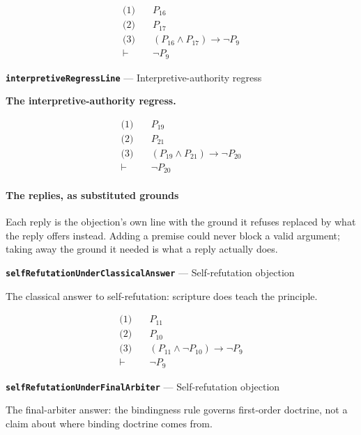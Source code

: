 \documentclass[11pt]{article}
\begin{document}
\begin{align*}
  \text{(1)} \quad & P_{16} \\
  \text{(2)} \quad & P_{17} \\
  \text{(3)} \quad & (P_{16} \land P_{17}) \rightarrow \lnot P_{9} \\
  \vdash \quad & \lnot P_{9}
\end{align*}
\par\medskip\noindent\textbf{\texttt{interpretive\allowbreak{}Regress\allowbreak{}Line}} --- Interpretive-authority regress\par\nobreak\noindent
\textbf{The interpretive-authority regress.}

\begin{align*}
  \text{(1)} \quad & P_{19} \\
  \text{(2)} \quad & P_{21} \\
  \text{(3)} \quad & (P_{19} \land P_{21}) \rightarrow \lnot P_{20} \\
  \vdash \quad & \lnot P_{20}
\end{align*}
\paragraph*{The replies, as substituted grounds}
\leavevmode\par
Each reply is the objection's own line with the ground it refuses replaced by what the reply offers instead. Adding a premise could never block a valid argument; taking away the ground it needed is what a reply actually does.

\par\medskip\noindent\textbf{\texttt{self\allowbreak{}Refutation\allowbreak{}Under\allowbreak{}Classical\allowbreak{}Answer}} --- Self-refutation objection\par\nobreak\noindent
The classical answer to self-refutation: scripture does teach the principle.

\begin{align*}
  \text{(1)} \quad & P_{11} \\
  \text{(2)} \quad & P_{10} \\
  \text{(3)} \quad & (P_{11} \land \lnot P_{10}) \rightarrow \lnot P_{9} \\
  \vdash \quad & \lnot P_{9}
\end{align*}
\par\medskip\noindent\textbf{\texttt{self\allowbreak{}Refutation\allowbreak{}Under\allowbreak{}Final\allowbreak{}Arbiter}} --- Self-refutation objection\par\nobreak\noindent
The final-arbiter answer: the bindingness rule governs first-order doctrine, not a claim about where binding doctrine comes from.
\end{document}
